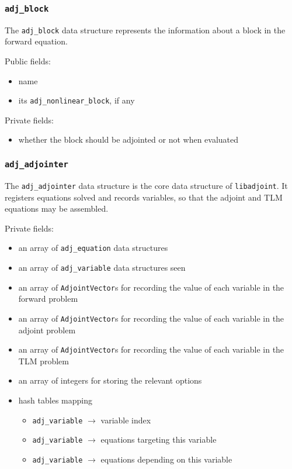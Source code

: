 \documentclass[10pt,authoryear]{elsarticle}
\newcommand{\libadjoint}[0]{{\texttt{libadjoint}}}
\begin{document}
\subsubsection{\texttt{{adj\_block}}}
The \texttt{adj\_block} data structure represents the information about a block in the forward equation.

Public fields:
\begin{itemize}
\item name
\item its \texttt{adj\_nonlinear\_block}, if any
\end{itemize}

Private fields:
\begin{itemize}
\item whether the block should be adjointed or not when evaluated
\end{itemize}

\subsubsection{\texttt{{adj\_adjointer}}}
The \texttt{adj\_adjointer} data structure is the core data structure of \libadjoint. It registers
equations solved and records variables, so that the adjoint and TLM equations may be assembled.

Private fields:
\begin{itemize}
\item an array of \texttt{adj\_equation} data structures
\item an array of \texttt{adj\_variable} data structures seen
\item an array of \texttt{AdjointVector}s for recording the value of each variable in the forward problem
\item an array of \texttt{AdjointVector}s for recording the value of each variable in the adjoint problem
\item an array of \texttt{AdjointVector}s for recording the value of each variable in the TLM problem
\item an array of integers for storing the relevant options
\item hash tables mapping
 \begin{itemize}
 \item \texttt{adj\_variable} $\rightarrow$ variable index
 \item \texttt{adj\_variable} $\rightarrow$ equations targeting this variable
 \item \texttt{adj\_variable} $\rightarrow$ equations depending on this variable
 \end{itemize}
\end{itemize}
\end{document}
